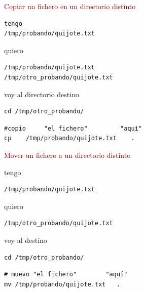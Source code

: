 \documentclass[ucs]{beamer}
\newcommand{\res}[1]{\textcolor{darkred}{#1}}
\begin{document}
\begin{frame}[fragile]

\res{Copiar un fichero en un directorio distinto}

  \begin{footnotesize}
  \begin{verbatim}
tengo
/tmp/probando/quijote.txt
  \end{verbatim}
  \end{footnotesize}
quiero
  \begin{footnotesize}
  \begin{verbatim}
/tmp/probando/quijote.txt
/tmp/otro_probando/quijote.txt
  \end{verbatim}
  \end{footnotesize}

voy al directorio destino
  \begin{footnotesize}
  \begin{verbatim}
cd /tmp/otro_probando/
  \end{verbatim}
  \end{footnotesize}

  \begin{footnotesize}
  \begin{verbatim}
#copio     "el fichero"         "aquí"
cp    /tmp/probando/quijote.txt    .  
  \end{verbatim}
  \end{footnotesize}

\end{frame}
\begin{frame}[fragile]

\res{Mover un fichero a un directorio distinto}

tengo
  \begin{footnotesize}
  \begin{verbatim}
/tmp/probando/quijote.txt
  \end{verbatim}
  \end{footnotesize}
quiero
  \begin{footnotesize}
  \begin{verbatim}
/tmp/otro_probando/quijote.txt
  \end{verbatim}
  \end{footnotesize}


voy al destino
  \begin{footnotesize}
  \begin{verbatim}
cd /tmp/otro_probando/
  \end{verbatim}
  \end{footnotesize}

  \begin{footnotesize}
  \begin{verbatim}
# muevo "el fichero"        "aquí"
mv /tmp/probando/quijote.txt   .  
  \end{verbatim}
  \end{footnotesize}

\end{frame}
\end{document}
